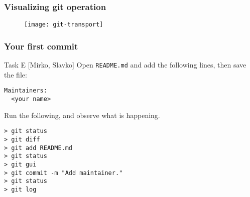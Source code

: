 \begin{frame}
	\frametitle{Visualizing git operation}
	
	\begin{figure}
		\texttt{[image: git-transport]}
	\end{figure}
\end{frame}



\begin{frame}[fragile]
	\frametitle{Your first commit}
	
	\begin{block}{Task E [Mirko, Slavko]}
	Open \texttt{README.md} and add the following lines, then save the file:
	\begin{verbatim}
Maintainers:
  <your name>
	\end{verbatim}

Run the following, and observe what is happening.

	\begin{verbatim}
> git status
> git diff
> git add README.md
> git status
> git gui
> git commit -m "Add maintainer."
> git status
> git log
	\end{verbatim}
	
	\end{block}
	
\end{frame}



